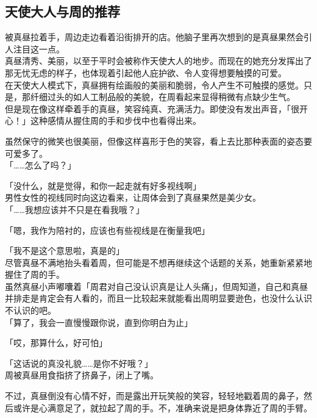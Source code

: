\subsection{天使大人与周的推荐}

被真昼拉着手，周边走边看着沿街排开的店。他脑子里再次想到的是真昼果然会引人注目这一点。\\

真昼清秀、美丽，以至于平时会被称作天使大人的地步。而现在的她充分发挥出了那无忧无虑的样子，也体现着引起他人庇护欲、令人变得想要触摸的可爱。\\

在天使大人模式下，真昼拥有绘画般的美丽和脆弱，令人产生不可触摸的感觉。只是，那纤细过头的如人工制品般的美貌，在周看起来显得稍微有点缺少生气。\\

但是现在像这样牵着手的真昼，笑容纯真、充满活力。即使没有发出声音，「很开心！」这种感情从握住周的手和步伐中也看得出来。

虽然保守的微笑也很美丽，但像这样喜形于色的笑容，看上去比那种表面的姿态要可爱多了。\\

「……怎么了吗？」

「没什么，就是觉得，和你一起走就有好多视线啊」\\

男性女性的视线同时向这边看来，让周体会到了真昼果然是美少女。\\

「……我想应该并不只是在看我哦？」

「嗯，我作为陪衬的，应该也有些视线是在衡量我吧」

「我不是这个意思啦，真是的」\\

尽管真昼不满地抬头看着周，但可能是不想再继续这个话题的关系，她重新紧紧地握住了周的手。\\

虽然真昼小声嘟囔着「周君对自己没认识真是让人头痛」，但周知道，自己和真昼并排走是肯定会有人看的，而且一比较起来就能看出周明显要逊色，也没什么认识不认识的吧。\\

「算了，我会一直慢慢跟你说，直到你明白为止」

「哎，那算什么，好可怕」

「这话说的真没礼貌……是你不好哦？」\\

周被真昼用食指挤了挤鼻子，闭上了嘴。

不过，真昼倒没有心情不好，而是露出开玩笑般的笑容，轻轻地戳着周的鼻子，然后或许是心满意足了，就拉起了周的手。不，准确来说是把身体靠近了周的手臂。\\

